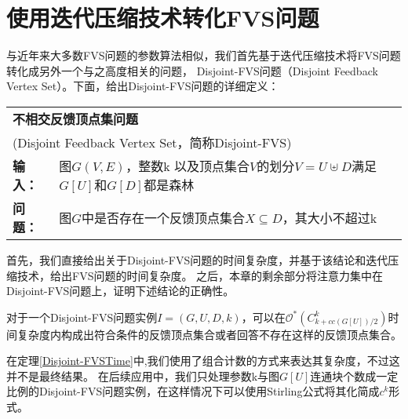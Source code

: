 \section{使用迭代压缩技术转化FVS问题}
与近年来大多数FVS问题的参数算法相似，我们首先基于迭代压缩技术将FVS问题转化成另外一个与之高度相关的问题，
Disjoint-FVS问题（Disjoint Feedback Vertex Set）。下面，给出Disjoint-FVS问题的详细定义：\\

\begin{tabular}{ | p{0.06\headwidth} p{0.80\headwidth} | }
  \hline
  \multicolumn{2}{|l|}{ \textbf{不相交反馈顶点集问题} }\\
  \multicolumn{2}{|l|}{ (Disjoint Feedback Vertex Set，简称Disjoint-FVS)}\\
  \textbf{输入：} & 图$G(V, E)$，整数k 以及顶点集合$V$的划分$V = U \uplus D$满足$G[U]$和$G[D]$都是森林\\
  \textbf{问题：} & 图$G$中是否存在一个反馈顶点集合$X \subseteq D$，其大小不超过k\\
  \hline
\end{tabular} \vspace{0.5cm}

首先，我们直接给出关于Disjoint-FVS问题的时间复杂度，并基于该结论和迭代压缩技术，给出FVS问题的时间复杂度。
之后，本章的剩余部分将注意力集中在Disjoint-FVS问题上，证明下述结论的正确性。
\begin{theorem} \label{Disjoint-FVSTime}
  对于一个Disjoint-FVS问题实例$I = (G, U, D, k)$，可以在$\mathcal{O}^*(C^k_{k + cc(G[U])/2})$时间复杂度内构成出符合条件的反馈顶点集合或者回答不存在这样的反馈顶点集合。
\end{theorem}

在定理\ref{Disjoint-FVSTime}中,我们使用了组合计数的方式来表达其复杂度，不过这并不是最终结果。
在后续应用中，我们只处理参数k与图$G[U]$连通块个数成一定比例的Disjoint-FVS问题实例，在这样情况下可以使用Stirling公式将其化简成$c^k$形式。

